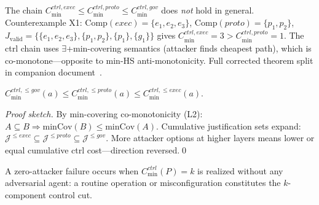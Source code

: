 \begin{remark}
The chain $C_{\min}^{ctrl,exec}\leq C_{\min}^{ctrl,proto}\leq C_{\min}^{ctrl,gov}$
does \emph{not} hold in general. Counterexample X1:
$\mathrm{Comp}(exec)=\{e_1,e_2,e_3\}$, $\mathrm{Comp}(proto)=\{p_1,p_2\}$,
$J_{\mathrm{valid}}=\{\{e_1,e_2,e_3\},\{p_1,p_2\},\{p_1\},\{g_1\}\}$
gives $C_{\min}^{ctrl,exec}=3 > C_{\min}^{ctrl,proto}=1$.
The ctrl chain uses $\exists$+min-covering semantics (attacker finds cheapest path),
which is co-monotone---opposite to min-HS anti-monotonicity.
Full corrected theorem split in companion document~\cite{proofs-companion}.
\end{remark}

\begin{theorem}\label{thm:el-ctrl-cumul}
$C_{\min}^{ctrl,\leq gov}(a) \leq C_{\min}^{ctrl,\leq proto}(a) \leq C_{\min}^{ctrl,\leq exec}(a)$.
\end{theorem}

\begin{proof}[Proof sketch]
By min-covering co-monotonicity (L2): $A\subseteq B \Rightarrow \mathrm{minCov}(B)\leq\mathrm{minCov}(A)$.
Cumulative justification sets expand: $\mathcal{J}^{\leq exec}\subseteq\mathcal{J}^{\leq proto}\subseteq\mathcal{J}^{\leq gov}$.
More attacker options at higher layers means lower or equal cumulative ctrl cost---direction reversed.\qed
\end{proof}

\begin{definition}\label{def:zero-attacker}
A zero-attacker failure occurs when $C_{\min}^{ctrl}(P)=k$ is realized
without any adversarial agent: a routine operation or misconfiguration
constitutes the $k$-component control cut.
\end{definition}
